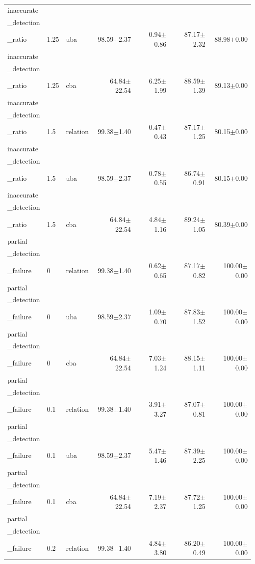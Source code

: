 \begin{table}[t]
\begin{tabular}{lllrrrr}
inaccurate\\_detection\\_ratio & 1.25 & uba & 98.59$\pm$2.37 & 0.94$\pm$0.86 & 87.17$\pm$2.32 & 88.98$\pm$0.00 \\
inaccurate\\_detection\\_ratio & 1.25 & cba & 64.84$\pm$22.54 & 6.25$\pm$1.99 & 88.59$\pm$1.39 & 89.13$\pm$0.00 \\
inaccurate\\_detection\\_ratio & 1.5 & relation & 99.38$\pm$1.40 & 0.47$\pm$0.43 & 87.17$\pm$1.25 & 80.15$\pm$0.00 \\
inaccurate\\_detection\\_ratio & 1.5 & uba & 98.59$\pm$2.37 & 0.78$\pm$0.55 & 86.74$\pm$0.91 & 80.15$\pm$0.00 \\
inaccurate\\_detection\\_ratio & 1.5 & cba & 64.84$\pm$22.54 & 4.84$\pm$1.16 & 89.24$\pm$1.05 & 80.39$\pm$0.00 \\
partial\\_detection\\_failure & 0 & relation & 99.38$\pm$1.40 & 0.62$\pm$0.65 & 87.17$\pm$0.82 & 100.00$\pm$0.00 \\
partial\\_detection\\_failure & 0 & uba & 98.59$\pm$2.37 & 1.09$\pm$0.70 & 87.83$\pm$1.52 & 100.00$\pm$0.00 \\
partial\\_detection\\_failure & 0 & cba & 64.84$\pm$22.54 & 7.03$\pm$1.24 & 88.15$\pm$1.11 & 100.00$\pm$0.00 \\
partial\\_detection\\_failure & 0.1 & relation & 99.38$\pm$1.40 & 3.91$\pm$3.27 & 87.07$\pm$0.81 & 100.00$\pm$0.00 \\
partial\\_detection\\_failure & 0.1 & uba & 98.59$\pm$2.37 & 5.47$\pm$1.46 & 87.39$\pm$2.25 & 100.00$\pm$0.00 \\
partial\\_detection\\_failure & 0.1 & cba & 64.84$\pm$22.54 & 7.19$\pm$2.37 & 87.72$\pm$1.25 & 100.00$\pm$0.00 \\
partial\\_detection\\_failure & 0.2 & relation & 99.38$\pm$1.40 & 4.84$\pm$3.80 & 86.20$\pm$0.49 & 100.00$\pm$0.00 \\

\end{tabular}
\end{table}
